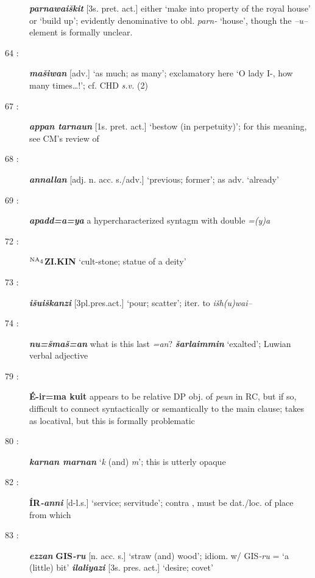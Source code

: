 \documentclass[10pt]{article}
\newcommand{\supersc}[1]{$^{\textrm{\scriptsize{#1}}}$}  	%
\newcommand{\subsc}[1]{$_{\textrm{\scriptsize{#1}}}$}	%
\newcommand{\bit}[1]{\textbf{\textit{#1}}}				%
\newcommand{\p}[1]{{\tiny[{#1}]}}					%
\newcommand{\hith}{\textsubwedge{h}}
\renewcommand{\.}[1]{\textsubdot{#1}}
\begin{document}
\begin{description}
\bit{parnawai\v{s}kit} \p{3s. pret. act.} either `make into property of the royal house' or `build up'; evidently denominative to obl. \textit{parn-} `house', though the \textit{--u--}element is formally unclear.

\item[64 :] \bit{ma\v{s}iwan} \p{adv.} `as much; as many'; exclamatory here `O lady I-, how many times{\ldots}!'; cf. CHD \textit{s.v.} (2)

\item[67 :] \bit{appan tarna{\hith\hith}un} \p{1s. pret. act.} `bestow (in perpetuity)'; for this meaning, see CM's review of \citet{otten1988bronze}

\item[68 :] \bit{annallan} \p{adj. n. acc. s./adv.} `previous; former'; as adv. `already'

\item[69 :] \bit{apadd=a=ya} a hypercharacterized syntagm with double \textit{=(y)a}

\item[72 :] \textbf{\supersc{NA\subsc{4}}ZI.KIN} `cult-stone; statue of a deity'

\item[73 :] \bit{i\v{s}{\hith}ui\v{s}kanzi} \p{3pl.pres.act.} `pour; scatter'; iter. to \textit{i\v{s}h(u)wai--} 

\item[74 :] \bit{nu=\v{s}ma\v{s}=an} what is this last \textit{=an}? \bit{\v{s}arlaimmin} `exalted'; Luwian verbal adjective

\item[79 :] \textbf{\'E-ir=ma kuit} appears to be relative DP obj. of \textit{pe{\hith\hith}un} in RC, but if so, difficult to connect syntactically or semantically to the main clause; \citet[28]{otten1981hattusili} takes as locatival, but this is formally problematic

\item[80 :] \bit{karnan marnan} `\textit{k} (and) \textit{m}'; this is utterly opaque

\item[82 :] \textbf{\'IR}\bit{-anni} \p{d-l.s.} `service; servitude'; contra \citet[30--1]{otten1981hattusili}, must be dat./loc. of place from which

\item[83 :] \bit{ezzan} \textbf{GIS}\bit{-ru} \p{n. acc. s.} `straw (and) wood'; idiom. w/ GIS{\it-ru} = `a (little) bit' \bit{ilaliyazi} \p{3s. pres. act.} `desire; covet'


\end{description}
\end{document}
